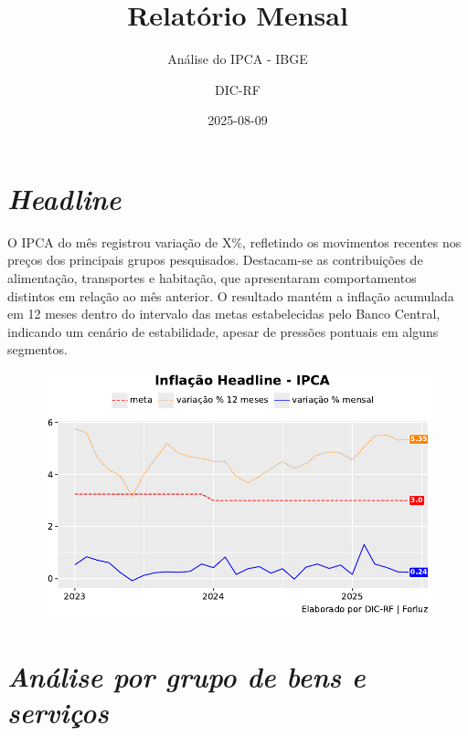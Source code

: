 \documentclass[
  letterpaper,
  DIV=11,
  numbers=noendperiod]{scrartcl}
\title{Relatório Mensal}
\subtitle{Análise do IPCA - IBGE}
\author{DIC-RF}
\date{2025-08-09}
\renewcommand*\contentsname{Índice}
\newcommand\contentsname{Índice}
\begin{document}
\maketitle
\ifdefined\Shaded\renewenvironment{Shaded}{\begin{tcolorbox}[enhanced, boxrule=0pt, breakable, interior hidden, borderline west={3pt}{0pt}{shadecolor}, frame hidden, sharp corners]}{\end{tcolorbox}}\fi

\renewcommand*\contentsname{Índice}
{
\hypersetup{linkcolor=}
\setcounter{tocdepth}{3}
\tableofcontents
}
\hypertarget{headline}{%
\section{\texorpdfstring{\emph{Headline}}{Headline}}\label{headline}}

O IPCA do mês registrou variação de X\%, refletindo os movimentos
recentes nos preços dos principais grupos pesquisados. Destacam-se as
contribuições de alimentação, transportes e habitação, que apresentaram
comportamentos distintos em relação ao mês anterior. O resultado mantém
a inflação acumulada em 12 meses dentro do intervalo das metas
estabelecidas pelo Banco Central, indicando um cenário de estabilidade,
apesar de pressões pontuais em alguns segmentos.

\begin{figure}

{\centering \includegraphics{IPCAForluz_files/figure-pdf/cell-5-output-1.pdf}

}

\end{figure}

\hypertarget{anuxe1lise-por-grupo-de-bens-e-serviuxe7os}{%
\section{\texorpdfstring{\emph{Análise por grupo de bens e
serviços}}{Análise por grupo de bens e serviços}}\label{anuxe1lise-por-grupo-de-bens-e-serviuxe7os}}
\end{document}

